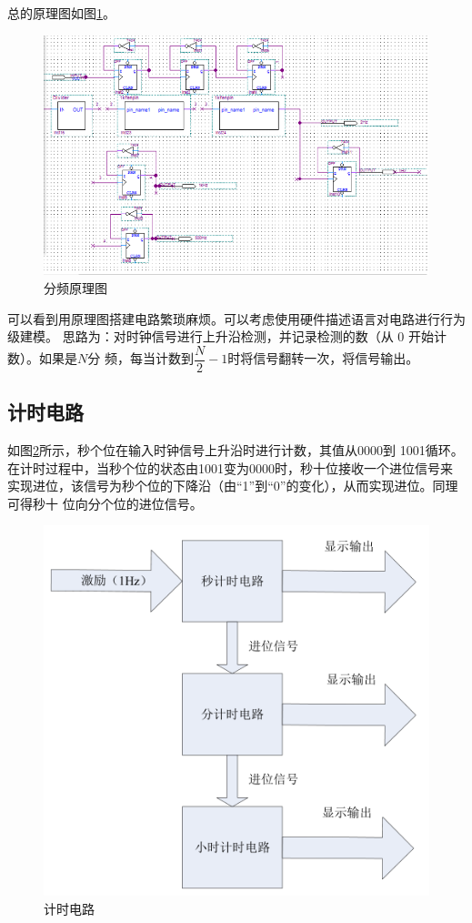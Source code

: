 \documentclass[twoside, openright]{article}
\begin{document}
总的原理图如图\ref{fig:分频原理图}。

\begin{figure}[htbp]
	\centering
	\includegraphics[width = 0.8\linewidth]{divider.png}
	\caption{分频原理图}
	\label{fig:分频原理图}
\end{figure}

可以看到用原理图搭建电路繁琐麻烦。可以考虑使用硬件描述语言对电路进行行为级建模。
思路为：对时钟信号进行上升沿检测，并记录检测的数（从 0 开始计数）。如果是$ N $分
频，每当计数到$ \dfrac{N}{2} - 1 $时将信号翻转一次，将信号输出。



\subsection{计时电路}%
\label{sub:计时电路}

如图\ref{fig:计时电路}所示，秒个位在输入时钟信号上升沿时进行计数，其值从0000到
1001循环。在计时过程中，当秒个位的状态由1001变为0000时，秒十位接收一个进位信号来
实现进位，该信号为秒个位的下降沿（由“1”到“0”的变化），从而实现进位。同理可得秒十
位向分个位的进位信号。

\begin{figure}[htbp]
	\centering
	\includegraphics[width = 0.6\linewidth]{count.png}
	\caption{计时电路}
	\label{fig:计时电路}
\end{figure}
\end{document}
